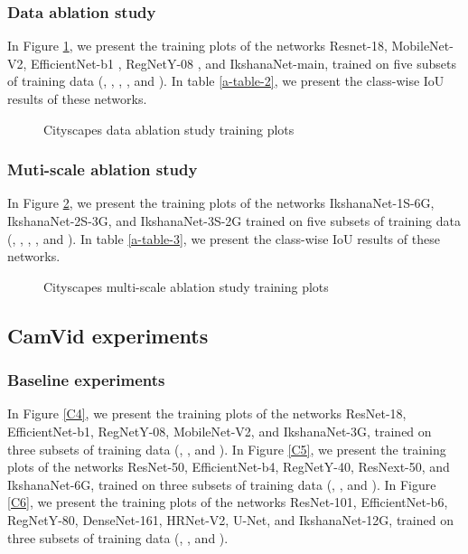 \documentclass{article}
\begin{document}
\subsubsection{Data ablation study}
In Figure \ref{C2}, we present the training plots of the networks Resnet-18, MobileNet-V2, EfficientNet-b1 , RegNetY-08 , and IkshanaNet-main,  trained on five subsets of training data (, , , , and ).
In table \ref{a-table-2}, we present the class-wise IoU results of these networks.  
\begin{figure}[ht]
\centering     {}
\caption{Cityscapes data ablation study training plots}
\label{C2}
\end{figure}


\subsubsection{Muti-scale ablation study}
In Figure \ref{C3}, we present the training plots of the networks IkshanaNet-1S-6G,  IkshanaNet-2S-3G, and IkshanaNet-3S-2G trained on five subsets of training data (, , , , and ).\newline
In table \ref{a-table-3}, we present the class-wise IoU results of these networks. 


\begin{figure}[ht]
\centering     {}
\caption{Cityscapes multi-scale ablation study training plots}
\label{C3}
\end{figure}

\subsection{CamVid experiments}
\subsubsection{Baseline experiments}
In Figure \ref{C4}, we present the training plots of the networks ResNet-18, EfficientNet-b1, RegNetY-08, MobileNet-V2, and IkshanaNet-3G, trained on three subsets of training data (, , and ).\newline
In Figure \ref{C5}, we present the training plots of the networks ResNet-50, EfficientNet-b4, RegNetY-40, ResNext-50, and IkshanaNet-6G, trained on three subsets of training data (, , and ).\newline
In Figure \ref{C6}, we present the training plots of the networks ResNet-101, EfficientNet-b6, RegNetY-80, DenseNet-161, HRNet-V2, U-Net, and IkshanaNet-12G, trained on three subsets of training data (, , and ).\newline
\end{document}
